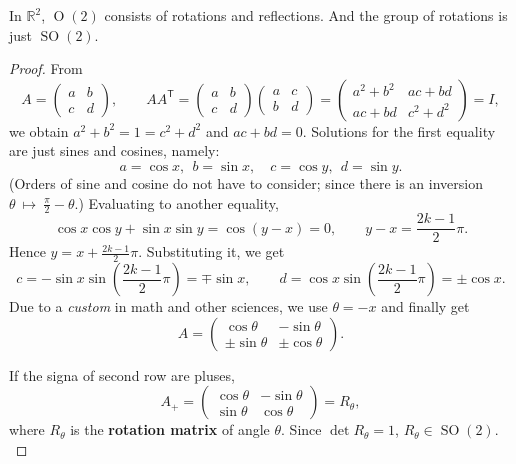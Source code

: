 \begin{prop}
\hfill

In $\mathbb R^2$, $\operatorname{O}(2)$ consists of rotations and reflections. And the group of rotations is just $\operatorname{SO}(2).$
\begin{proof}From
$$A=\begin{pmatrix}a&b\\c&d\end{pmatrix}, \qquad AA^\mathsf T = \begin{pmatrix}a&b\\c&d\end{pmatrix}\begin{pmatrix}a&c\\b&d\end{pmatrix} = \begin{pmatrix}a^2+b^2&ac+bd\\ac+bd&c^2+d^2\end{pmatrix} = I,$$
we obtain $a^2 + b^2 = 1 = c^2 + d^2$ and $ac+bd = 0$. Solutions for the first equality are just sines and cosines, namely: $$a = \cos x, ~~b = \sin x, \quad c = \cos y,~~d = \sin y.$$ (Orders of sine and cosine do not have to consider; since there is an inversion $\theta~\mapsto~\frac \pi 2 - \theta$.) Evaluating to another equality, $$\cos x \cos y + \sin x \sin y = \cos(y-x) = 0,\qquad y-x = \frac{2k-1}{2}\pi.$$ Hence $y = x + \frac{2k-1}{2}\pi.$ Substituting it, we get $$c = - \sin x \sin \left(\frac{2k-1}{2}\pi\right) = \mp \sin x,\qquad d = \cos x \sin \left(\frac{2k-1}{2}\pi\right) = \pm \cos x.$$ Due to a \textit{custom} in math and other sciences, we use $\theta = -x$ and finally get $$A=\begin{pmatrix}\cos \theta &-\sin \theta \\ \pm \sin \theta & \pm \cos \theta \end{pmatrix}.$$

If the signa of second row are pluses, $$A_+ = \begin{pmatrix}\cos \theta &-\sin \theta \\\sin \theta & \cos \theta \end{pmatrix} = R_\theta,$$ where $R_\theta$ is the \textbf{rotation matrix} of angle $\theta$. Since $ \operatorname{det}R_\theta = 1$, $R_\theta \in \operatorname{SO}(2).$


\end{proof}
\end{prop}
